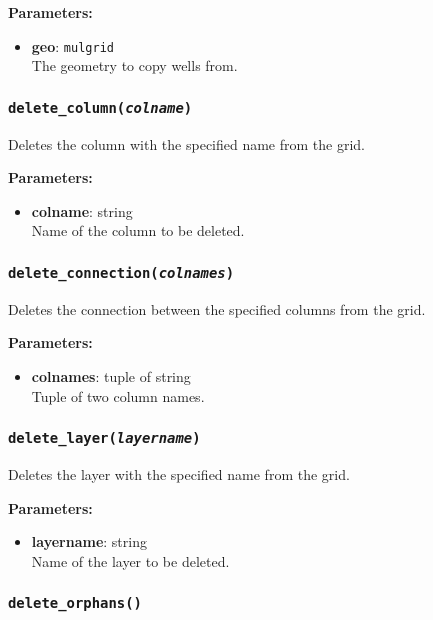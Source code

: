 \textbf{Parameters:}
\begin{itemize}
\item \textbf{geo}: \texttt{mulgrid}\\
  The geometry to copy wells from.
\end{itemize}

\subsubsection{\texttt{delete\_column(\emph{colname})}}

Deletes the column with the specified name from the grid.

\textbf{Parameters:}
\begin{itemize}
\item \textbf{colname}: string\\
  Name of the column to be deleted.
\end{itemize}

\subsubsection{\texttt{delete\_connection(\emph{colnames})}}

Deletes the connection between the specified columns from the grid.

\textbf{Parameters:}
\begin{itemize}
\item \textbf{colnames}: tuple of string\\
  Tuple of two column names.
\end{itemize}

\subsubsection{\texttt{delete\_layer(\emph{layername})}}

Deletes the layer with the specified name from the grid.

\textbf{Parameters:}
\begin{itemize}
\item \textbf{layername}: string\\
  Name of the layer to be deleted.
\end{itemize}

\subsubsection{\texttt{delete\_orphans()}}

